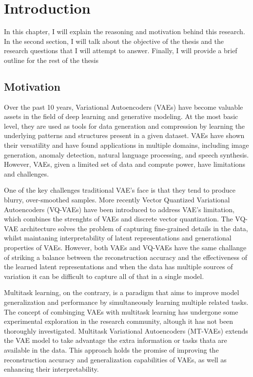 \chapter{Introduction}

In this chapter, I will explain the reasoning and motivation behind this research. In the second section, I will talk about the objective of the thesis and the research questions that I will attempt to answer. Finally, I will provide a brief outline for the rest of the thesis

\section{Motivation}

Over the past 10 years, Variational Autoencoders (VAEs) have become valuable assets in the field of deep learning and generative modeling. At the most basic level, they are used as tools for data generation and compression by learning the underlying patterns and structures present in a given dataset. VAEs have shown their versatility and have found applications in multiple domains, including image generation, anomaly detection, natural language processing, and speech synthesis. However, VAEs, given a limited set of data and compute power, have limitations and challenges.\cite{kingma2013autoencoding,Kingma_2019, vqvae, dalle}

One of the key challenges traditional VAE's face is that they tend to produce blurry, over-smoothed samples. More recently Vector Quantized Variational Autoencoders (VQ-VAEs) have been introduced to address VAE's limitation, which combines the strenghts of VAEs and discrete vector quantization.\cite{dalle} The VQ-VAE architecture solves the problem of capturing fine-grained details in the data, whilst maintaning interpretability of latent representations and generational properties of VAEs. However, both VAEs and VQ-VAEs have the same challange of striking a balance between the reconstruction accuracy and the effectiveness of the learned latent representations and when the data has multiple sources of variation it can be difficult to capture all of that in a single model.\cite{Kingma_2019,betavae, vqvae}

Multitask learning, on the contrary, is a paradigm that aims to improve model generalization and performance by simultaneously learning multiple related tasks. The concept of combinging VAEs with multitask learning has undergone some experimental exploration in the research community, altough it has not been thoroughly investigated.\cite{multitaskvib} Multitask Variational Autoencoders (MT-VAEs) extends the VAE model to take advantage the extra information or tasks thata are available in the data. This approach holds the promise of improving the reconstruction accuracy and generalization capabilities of VAEs, as well as enhancing their interpretability.\cite{multitasklearning}

